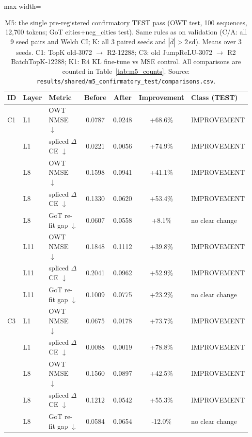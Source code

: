 \begin{table}[t]
\centering
\small
\caption{M5: the single pre-registered confirmatory TEST pass (OWT test, 100 sequences, 12,700 tokens; GoT cities+neg\_cities test). Same rules as on validation (C/A: all 9 seed pairs and Welch CI; K: all 3 paired seeds and $|\bar d|>2\,$sd). Means over 3 seeds. C1: TopK old-3072 $\rightarrow$ R2-12288; C3: old JumpReLU-3072 $\rightarrow$ R2 BatchTopK-12288; K1: R4 KL fine-tune vs MSE control. All comparisons are counted in Table~\ref{tab:m5_counts}. Source: \texttt{results/\allowbreak{}shared/\allowbreak{}m5\_confirmatory\_test/\allowbreak{}comparisons.csv}.}
\label{tab:m5}
\begin{adjustbox}{max width=\linewidth}
\begin{tabular}{lllcccl}
\toprule
ID & Layer & Metric & Before & After & Improvement & Class (TEST) \\
\midrule
C1 & L1 & OWT NMSE $\downarrow$ & 0.0787 & 0.0248 & +68.6\% & IMPROVEMENT \\
 & L1 & spliced $\Delta$CE $\downarrow$ & 0.0221 & 0.0056 & +74.9\% & IMPROVEMENT \\
 & L8 & OWT NMSE $\downarrow$ & 0.1598 & 0.0941 & +41.1\% & IMPROVEMENT \\
 & L8 & spliced $\Delta$CE $\downarrow$ & 0.1330 & 0.0620 & +53.4\% & IMPROVEMENT \\
 & L8 & GoT re-fit gap $\downarrow$ & 0.0607 & 0.0558 & +8.1\% & no clear change \\
 & L11 & OWT NMSE $\downarrow$ & 0.1848 & 0.1112 & +39.8\% & IMPROVEMENT \\
 & L11 & spliced $\Delta$CE $\downarrow$ & 0.2041 & 0.0962 & +52.9\% & IMPROVEMENT \\
 & L11 & GoT re-fit gap $\downarrow$ & 0.1009 & 0.0775 & +23.2\% & no clear change \\
\midrule
C3 & L1 & OWT NMSE $\downarrow$ & 0.0675 & 0.0178 & +73.7\% & IMPROVEMENT \\
 & L1 & spliced $\Delta$CE $\downarrow$ & 0.0088 & 0.0019 & +78.8\% & IMPROVEMENT \\
 & L8 & OWT NMSE $\downarrow$ & 0.1560 & 0.0897 & +42.5\% & IMPROVEMENT \\
 & L8 & spliced $\Delta$CE $\downarrow$ & 0.1212 & 0.0542 & +55.3\% & IMPROVEMENT \\
 & L8 & GoT re-fit gap $\downarrow$ & 0.0584 & 0.0654 & -12.0\% & no clear change \\

\end{tabular}
\end{adjustbox}
\end{table}
